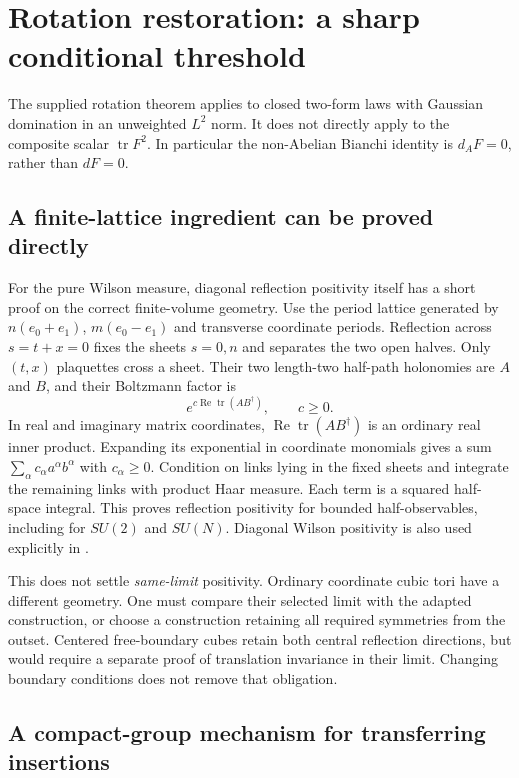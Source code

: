 \documentclass[11pt]{article}
\theoremstyle{remark}
\newcommand{\tr}{\operatorname{tr}}
\newcommand{\Rea}{\operatorname{Re}}
\begin{document}
\section{Rotation restoration: a sharp conditional threshold}

The supplied rotation theorem applies to closed two-form laws with
Gaussian domination in an unweighted $L^2$ norm. It does not directly
apply to the composite scalar $\tr F^2$. In particular the non-Abelian
Bianchi identity is $d_AF=0$, rather than $dF=0$.

\subsection{A finite-lattice ingredient can be proved directly}

For the pure Wilson measure, diagonal reflection positivity itself has a
short proof on the correct finite-volume geometry.
Use the period lattice generated by
$n(e_0+e_1)$, $m(e_0-e_1)$ and transverse coordinate periods.
Reflection across $s=t+x=0$ fixes the sheets $s=0,n$ and separates
the two open halves. Only $(t,x)$ plaquettes cross a sheet.
Their two length-two half-path holonomies are $A$ and $B$, and their
Boltzmann factor is
\[
 e^{c\Rea\tr(AB^\dagger)},\qquad c\geq0.
\]
In real and imaginary matrix coordinates,
$\Rea\tr(AB^\dagger)$ is an ordinary real inner product.
Expanding its exponential in coordinate monomials gives a sum
$\sum_\alpha c_\alpha a^\alpha b^\alpha$ with $c_\alpha\geq0$.
Condition on links lying in the fixed sheets and integrate the remaining
links with product Haar measure. Each term is a squared half-space
integral. This proves reflection positivity for bounded half-observables,
including for $SU(2)$ and $SU(N)$.
Diagonal Wilson positivity is also used explicitly in \cite{kz}.

This does not settle \emph{same-limit} positivity. Ordinary coordinate
cubic tori have a different geometry. One must compare their selected
limit with the adapted construction, or choose a construction retaining
all required symmetries from the outset.
Centered free-boundary cubes retain both central reflection directions,
but would require a separate proof of translation invariance in their
limit. Changing boundary conditions does not remove that obligation.

\subsection{A compact-group mechanism for transferring insertions}
\end{document}
